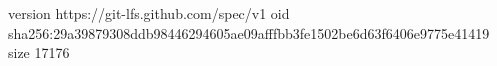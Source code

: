 version https://git-lfs.github.com/spec/v1
oid sha256:29a39879308ddb98446294605ae09afffbb3fe1502be6d63f6406e9775e41419
size 17176
